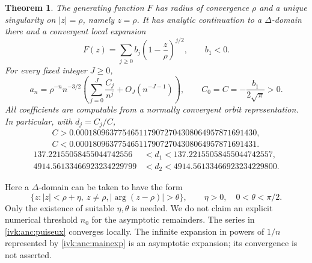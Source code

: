 \documentclass[11pt,letterpaper]{article}
\newtheorem{theorem}{Theorem}[section]
\theoremstyle{remark}\newtheorem{remark}[theorem]{Remark}
\begin{document}
\begin{theorem}\label{ivk:anc:thm:main}
The generating function $F$ has radius of convergence $\rho$ and a
unique singularity on $|z|=\rho$, namely $z=\rho$. It has analytic
continuation to a $\Delta$-domain there and a convergent local expansion
\begin{equation}\label{ivk:anc:puiseux}
 F(z)=\sum_{j\ge0}b_j\left(1-\frac z\rho\right)^{j/2},
 \qquad b_1<0.
\end{equation}
For every fixed integer $J\ge0$,
\begin{equation}\label{ivk:anc:mainexp}
 a_n=\rho^{-n}n^{-3/2}
       \left(\sum_{j=0}^{J}\frac{C_j}{n^j}
                         +O_J(n^{-J-1})\right),
 \qquad C_0=C=-\frac{b_1}{2\sqrt\pi}>0.
\end{equation}
All coefficients are computable from a normally convergent orbit
representation. In particular, with $d_j=C_j/C$,
\begin{equation}\label{ivk:anc:Cinterval}
\begin{gathered}
 C>0.0001809637754651179072704308064957871691430,\\
 C<0.0001809637754651179072704308064957871691431.
\end{gathered}
\end{equation}
\begin{align}
 137.22155058455044742556&<d_1<137.22155058455044742557,\label{ivk:anc:d1interval}\\
 4914.56133466923234229799&<d_2<4914.56133466923234229800.\label{ivk:anc:d2interval}
\end{align}
\end{theorem}

Here a $\Delta$-domain can be taken to have the form
\[
 \{z:|z|<\rho+\eta,\ z\ne\rho,
                  |\arg(z-\rho)|>\theta\},
 \qquad \eta>0,\quad 0<\theta<\pi/2.
\]
Only the existence of suitable $\eta,\theta$ is needed. We do not
claim an explicit numerical threshold $n_0$ for the asymptotic
remainders. The series in \eqref{ivk:anc:puiseux} converges locally. The
infinite expansion in powers of $1/n$ represented by \eqref{ivk:anc:mainexp}
is an asymptotic expansion; its convergence is not asserted.
\end{document}
